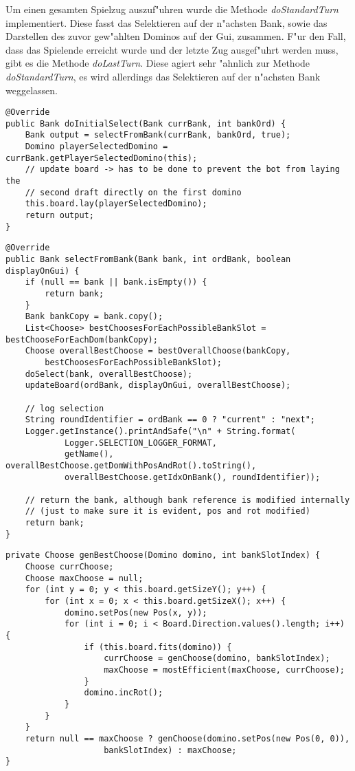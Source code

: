 Um einen gesamten Spielzug auszuf"uhren wurde die Methode \emph{doStandardTurn} implementiert. Diese fasst das Selektieren auf der n"achsten Bank, sowie das Darstellen des zuvor gew"ahlten Dominos auf der Gui, zusammen. F"ur den Fall, dass das Spielende erreicht wurde und der letzte Zug ausgef"uhrt werden muss, gibt es die Methode \emph{doLastTurn}. Diese agiert sehr "ahnlich zur Methode \emph{doStandardTurn}, es wird allerdings das Selektieren auf der n"achsten Bank weggelassen. 

\begin{lstlisting}[float,style=CodeHighlighting,caption=DefaultAIPlayer - doInitialSelect,label=lst:defaultAIPlayer_doInitialSelect]
@Override
public Bank doInitialSelect(Bank currBank, int bankOrd) {
    Bank output = selectFromBank(currBank, bankOrd, true);
    Domino playerSelectedDomino = currBank.getPlayerSelectedDomino(this);
    // update board -> has to be done to prevent the bot from laying the
    // second draft directly on the first domino
    this.board.lay(playerSelectedDomino);
    return output;
}
\end{lstlisting}
\begin{lstlisting}[float,style=CodeHighlighting,caption=DefaultAIPlayer - selectFromBank,label=lst:defaultAIPlayer_selectFromBank]
@Override
public Bank selectFromBank(Bank bank, int ordBank, boolean displayOnGui) {
    if (null == bank || bank.isEmpty()) {
        return bank;
    }
    Bank bankCopy = bank.copy();
    List<Choose> bestChoosesForEachPossibleBankSlot = bestChooseForEachDom(bankCopy);
    Choose overallBestChoose = bestOverallChoose(bankCopy, 
    	bestChoosesForEachPossibleBankSlot);
    doSelect(bank, overallBestChoose);
    updateBoard(ordBank, displayOnGui, overallBestChoose);

    // log selection
    String roundIdentifier = ordBank == 0 ? "current" : "next";
    Logger.getInstance().printAndSafe("\n" + String.format(
    		Logger.SELECTION_LOGGER_FORMAT,
            getName(), overallBestChoose.getDomWithPosAndRot().toString(),
            overallBestChoose.getIdxOnBank(), roundIdentifier));

    // return the bank, although bank reference is modified internally
    // (just to make sure it is evident, pos and rot modified)
    return bank;
}
\end{lstlisting}
\begin{lstlisting}[float,style=CodeHighlighting,caption=DefaultAIPlayer - genBestChoose,label=lst:defaultAIPlayer_genBestChoose]
private Choose genBestChoose(Domino domino, int bankSlotIndex) {
    Choose currChoose;
    Choose maxChoose = null;
    for (int y = 0; y < this.board.getSizeY(); y++) {
        for (int x = 0; x < this.board.getSizeX(); x++) {
            domino.setPos(new Pos(x, y));
            for (int i = 0; i < Board.Direction.values().length; i++) {
                if (this.board.fits(domino)) {
                    currChoose = genChoose(domino, bankSlotIndex);
                    maxChoose = mostEfficient(maxChoose, currChoose);
                }
                domino.incRot();
            }
        }
    }
    return null == maxChoose ? genChoose(domino.setPos(new Pos(0, 0)), 
    				bankSlotIndex) : maxChoose;
}
\end{lstlisting}
